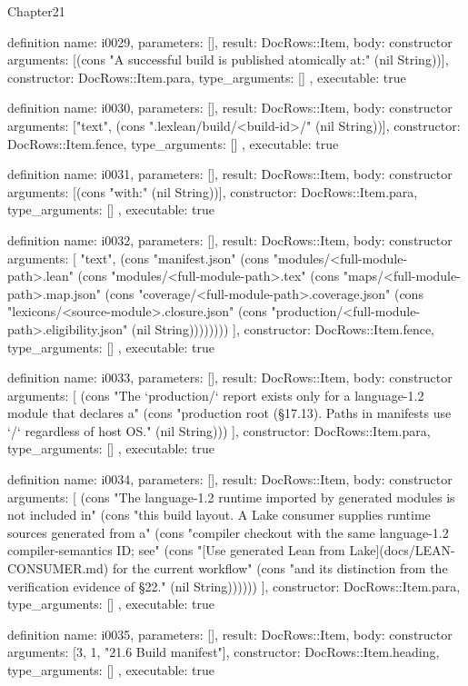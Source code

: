\begin{lexlean}{Chapter21}
\begin{semanticmodule}
definition{
  name: i0029,
  parameters: [],
  result: DocRows::Item,
  body: constructor{
    arguments: [(cons "A successful build is published atomically at:" (nil String))],
    constructor: DocRows::Item.para,
    type_arguments: []
  },
  executable: true
}

definition{
  name: i0030,
  parameters: [],
  result: DocRows::Item,
  body: constructor{
    arguments: ["text", (cons ".lexlean/build/<build-id>/" (nil String))],
    constructor: DocRows::Item.fence,
    type_arguments: []
  },
  executable: true
}

definition{
  name: i0031,
  parameters: [],
  result: DocRows::Item,
  body: constructor{
    arguments: [(cons "with:" (nil String))],
    constructor: DocRows::Item.para,
    type_arguments: []
  },
  executable: true
}

definition{
  name: i0032,
  parameters: [],
  result: DocRows::Item,
  body: constructor{
    arguments: [
      "text",
      (cons "manifest.json" (cons "modules/<full-module-path>.lean" (cons "modules/<full-module-path>.tex" (cons "maps/<full-module-path>.map.json" (cons "coverage/<full-module-path>.coverage.json" (cons "lexicons/<source-module>.closure.json" (cons "production/<full-module-path>.eligibility.json" (nil String))))))))
    ],
    constructor: DocRows::Item.fence,
    type_arguments: []
  },
  executable: true
}

definition{
  name: i0033,
  parameters: [],
  result: DocRows::Item,
  body: constructor{
    arguments: [
      (cons "The `production/` report exists only for a language-1.2 module that declares a" (cons "production root (§17.13). Paths in manifests use `/` regardless of host OS." (nil String)))
    ],
    constructor: DocRows::Item.para,
    type_arguments: []
  },
  executable: true
}

definition{
  name: i0034,
  parameters: [],
  result: DocRows::Item,
  body: constructor{
    arguments: [
      (cons "The language-1.2 runtime imported by generated modules is not included in" (cons "this build layout. A Lake consumer supplies runtime sources generated from a" (cons "compiler checkout with the same language-1.2 compiler-semantics ID; see" (cons "[Use generated Lean from Lake](docs/LEAN-CONSUMER.md) for the current workflow" (cons "and its distinction from the verification evidence of §22." (nil String))))))
    ],
    constructor: DocRows::Item.para,
    type_arguments: []
  },
  executable: true
}

definition{
  name: i0035,
  parameters: [],
  result: DocRows::Item,
  body: constructor{
    arguments: [3, 1, "21.6 Build manifest"],
    constructor: DocRows::Item.heading,
    type_arguments: []
  },
  executable: true
}


\end{semanticmodule}
\end{lexlean}
